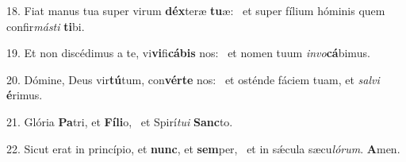 18. Fiat manus tua super virum \textbf{déx}teræ \textbf{tu}æ: \ast\  et super fílium hóminis quem confir\textit{más}\textit{ti} \textbf{ti}bi.\

19. Et non discédimus a te, vi\textbf{vi}fi\textbf{cá}\textbf{bis} nos: \ast\  et nomen tuum \textit{in}\textit{vo}\textbf{cá}bimus.\

20. Dómine, Deus vir\textbf{tú}tum, con\textbf{vér}\textbf{te} nos: \ast\  et osténde fáciem tuam, et \textit{sal}\textit{vi} \textbf{é}rimus.\

21. Glória \textbf{Pa}tri, et \textbf{Fí}\textbf{li}o, \ast\  et Spirí\textit{tu}\textit{i} \textbf{Sanc}to.\

22. Sicut erat in princípio, et \textbf{nunc}, et \textbf{sem}per, \ast\  et in sǽcula sæcu\textit{ló}\textit{rum}. \textbf{A}men.\

